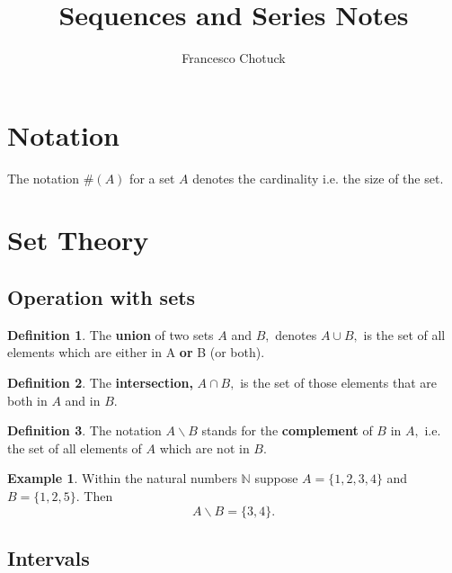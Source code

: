 \documentclass[12pt, a4paper]{article}
\title{Sequences and Series Notes}
\date{}
\author{Francesco Chotuck}
\newcommand{\bb}[1]{\mathbb{#1}}
\theoremstyle{definition}
\newtheorem{definition}{Definition}[section]
\newtheorem*{example}{Example}
\theoremstyle{plain}
\begin{document}
 
\maketitle 

\tableofcontents

\pagebreak

\section*{Notation}

The notation $\#(A)$ for a set $A$ denotes the cardinality i.e. the size of the set.

\section{Set Theory}

\subsection{Operation with sets}

\begin{definition}
The \textbf{union} of two sets $A$ and $B,$ denotes $A\cup B,$ is the set of all elements which are either in A \textbf{or} B (or both).
\end{definition}

\begin{definition}
The \textbf{intersection,} $A\cap B,$ is the set of those elements that are both in $A$ and in $B.$  
\end{definition}

\begin{definition}
The notation $A\backslash B$ stands for the \textbf{complement} of $B$ in $A,$ i.e. the set of all elements of $A$ which are not in $B.$ 
\end{definition}

\begin{example}
Within the natural numbers $\bb{N}$ suppose $A=\{1,2,3,4\}$ and $B=\{1,2,5\}.$ Then $$A\backslash B=\{3,4\}.$$
\end{example}

\subsection{Intervals}
	
\end{document}
